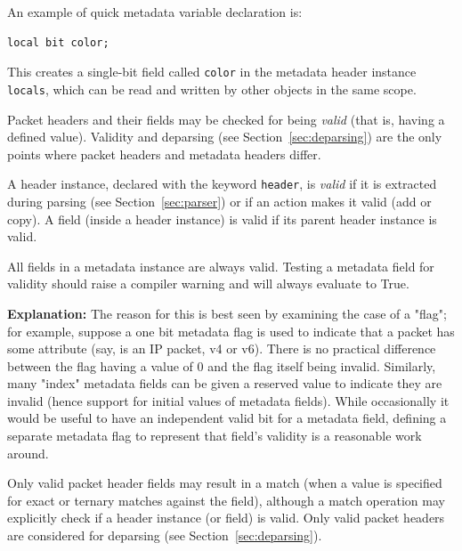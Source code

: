 \documentclass[12pt]{article}
\begin{document}
An example of quick metadata variable declaration is:

\begin{lstlisting}[style=P4style]
local bit color;
\end{lstlisting}

This creates a single-bit field called \texttt{color} in the metadata
header instance \texttt{locals}, which can be read and written by other objects
in the same scope.


Packet headers and their fields may be checked for being
\textit{valid} (that is, having a defined value). Validity and
deparsing (see Section~\ref{sec:deparsing}) are the only points where packet
headers and metadata headers differ.

A header instance, declared with the keyword \texttt{header}, is \textit{valid}
if it is extracted during parsing (see Section~\ref{sec:parser}) or if an action
makes it valid (add or copy). A field (inside a header instance) is valid if its
parent header instance is valid.

All fields in a metadata instance are always valid.  Testing a
metadata field for validity should raise a compiler warning and will
always evaluate to True.

\begin{adjustwidth}{1.5cm}{1.5cm}
\textbf{Explanation: } The reason for this is best seen by examining
the case of a "flag"; for example, suppose a one bit metadata flag is
used to indicate that a packet has some attribute (say, is an IP
packet, v4 or v6).  There is no practical difference between the flag
having a value of 0 and the flag itself being invalid.  Similarly,
many "index" metadata fields can be given a reserved value to indicate
they are invalid (hence support for initial values of metadata
fields).  While occasionally it would be useful to have an independent
valid bit for a metadata field, defining a separate metadata flag to
represent that field's validity is a reasonable work around.
\end{adjustwidth}

Only valid packet header fields may result in a match (when a value is
specified for exact or ternary matches against the field), although a
match operation may explicitly check if a header instance (or field)
is valid. Only valid packet headers are considered for deparsing (see
Section~\ref{sec:deparsing}).  
\end{document}
